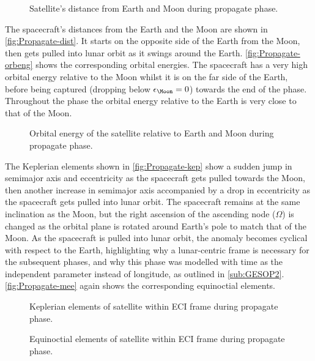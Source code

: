 \begin{figure}
\centering
\def\svgwidth{\figurewidth}

\caption{Satellite's distance from Earth and Moon during propagate phase.} \label{fig:Propagate-dist}
\end{figure}

The spacecraft's distances from the Earth and the Moon are shown in \autoref{fig:Propagate-dist}. It starts on the opposite side of the Earth from the Moon, then gets pulled into lunar orbit as it swings around the Earth. \autoref{fig:Propagate-orbeng} shows the corresponding orbital energies. The spacecraft has a very high orbital energy relative to the Moon whilst it is on the far side of the Earth, before being captured (dropping below $\epsilon_\Moon=0$) towards the end of the phase. Throughout the phase the orbital energy relative to the Earth is very close to that of the Moon.

\begin{figure}
\centering
\def\svgwidth{\figurewidth}

\caption{Orbital energy of the satellite relative to Earth and Moon during propagate phase.} \label{fig:Propagate-orbeng}
\end{figure}

The Keplerian elements shown in \autoref{fig:Propagate-kep} show a sudden jump in semimajor axis and eccentricity as the spacecraft gets pulled towards the Moon, then another increase in semimajor axis accompanied by a drop in eccentricity as the spacecraft gets pulled into lunar orbit. The spacecraft remains at the same inclination as the Moon, but the right ascension of the ascending node ($\Omega$) is changed as the orbital plane is rotated around Earth's pole to match that of the Moon. As the spacecraft is pulled into lunar orbit, the anomaly becomes cyclical with respect to the Earth, highlighting why a lunar-centric frame is necessary for the subsequent phases, and why this phase was modelled with time as the independent parameter instead of longitude, as outlined in \autoref{sub:GESOP2}. \autoref{fig:Propagate-mee} again shows the corresponding equinoctial elements.

\begin{figure}
\centering
\def\svgwidth{\figurewidth}

\caption{Keplerian elements of satellite within ECI frame during propagate phase.} \label{fig:Propagate-kep}
\end{figure}

\begin{figure}
\centering
\def\svgwidth{\figurewidth}

\caption{Equinoctial elements of satellite within ECI frame during propagate phase.} \label{fig:Propagate-mee}
\end{figure}

